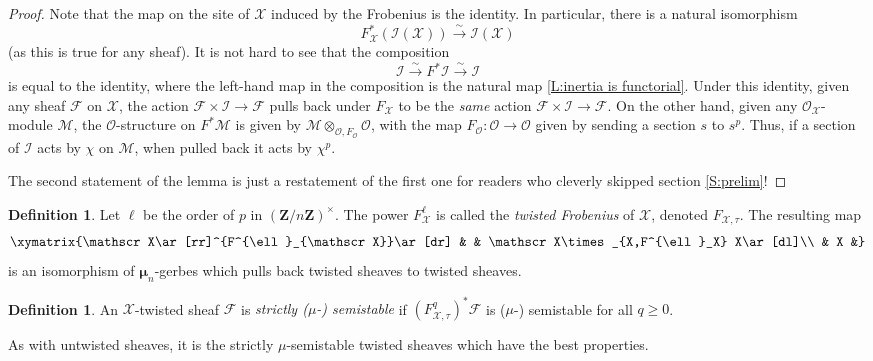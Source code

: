 \documentclass[11pt]{amsart}
\newcommand{\field}[1]{\mathbf #1}
\newcommand{\ms}[1]{\mathscr #1}
\newcommand{\Z}{\field Z}
\newcommand{\simto}{\stackrel{\sim}{\to}}
\newcommand{\m}{\boldsymbol{\mu}}
\renewcommand{\[}{[\!\hspace{0.03em}[}
\renewcommand{\]}{]\!\hspace{0.03em}]}
\renewcommand{\(}{(\!\hspace{0.03em}(}
\renewcommand{\)}{)\!\hspace{0.03em})}
\DeclareMathOperator*{\tensor}{\otimes}
\theoremstyle{definition}
\newtheorem{defn}[lem]{Definition}
\theoremstyle{remark}
\begin{document}
\begin{proof} Note that the map on the site of $\ms X$ induced by the 
Frobenius is the identity.  In particular, there is a natural 
isomorphism $$F_{\ms X}^{\ast}(\ms I(\ms X))\simto\ms I(\ms X)$$
(as this is true for any sheaf).
It is not hard to see that the composition
$$\ms I\simto F^{\ast}\ms I\simto\ms 
I$$
is equal to the identity, where the left-hand map 
in the composition is the natural map \ref{L:inertia is functorial}.  
Under this identity, given any sheaf $\ms F$ on $\ms X$, the action 
$\ms F\times\ms I\to\ms F$ pulls back under $F_{\ms X}$ to be the 
\emph{same\/} action $\ms F\times\ms I\to\ms F$.  
On the other hand, given any ${\ms O}_{\ms X}$-module $\ms M$, the 
${\ms O}$-structure on $F^{\ast}\ms M$ is given by $\ms 
M\tensor_{{\ms O},F_{{\ms O}}}{\ms O}$, with the map $F_{{\ms O}}:{\ms O}\to{\ms O}$ given by 
sending a section $s$ to $s^{p}$.  Thus, if a section of $\ms I$ acts 
by $\chi$ on $\ms M$, when pulled back it acts by $\chi^{p}$.

The second statement of the lemma is just a restatement of the first one for readers 
who cleverly skipped section \ref{S:prelim}!
\end{proof}

\begin{defn} Let $\ell$ be the order of $p$ in $(\Z/n\Z)^{\times}$.  
The power $F^{\ell}_{\ms X}$ is called the \emph{twisted Frobenius\/} 
of $\ms X$, denoted $F_{\ms X,\tau}$.  The resulting map
$$\xymatrix{\ms X\ar[rr]^{F^{\ell}_{\ms X}}\ar[dr] & & \ms X\times_{X,F^{\ell}_X} X\ar[dl]\\ & X &}$$
is an isomorphism of $\m_{n}$-gerbes which pulls back twisted sheaves 
to twisted sheaves.
\end{defn}
\begin{defn} An $\ms X$-twisted sheaf $\ms F$ is \emph{strictly 
($\mu$-)
semistable\/} if $(F^{q}_{\ms X,\tau})^{\ast}\ms F$ is ($\mu$-) 
semistable for all $q\geq 0$.
\end{defn}
As with untwisted sheaves, it is the strictly $\mu$-semistable 
twisted sheaves which have the best properties.
\end{document}
